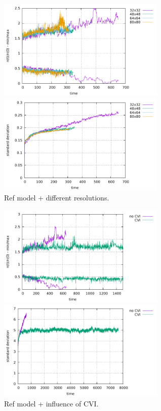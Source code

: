 \begin{center}
\includegraphics[width=8cm]{python_codes/fieldstone_30/results_dh/markercount_res}
\includegraphics[width=8cm]{python_codes/fieldstone_30/results_dh/stdev_res}\\
{\captionfont Ref model + different resolutions.}
\end{center}

\begin{center}
\includegraphics[width=8cm]{python_codes/fieldstone_30/results_dh/markercount_cvi_Q1}
\includegraphics[width=8cm]{python_codes/fieldstone_30/results_dh/stdev_cvi_Q1}\\
{\captionfont Ref model + influence of CVI.}
\end{center}

